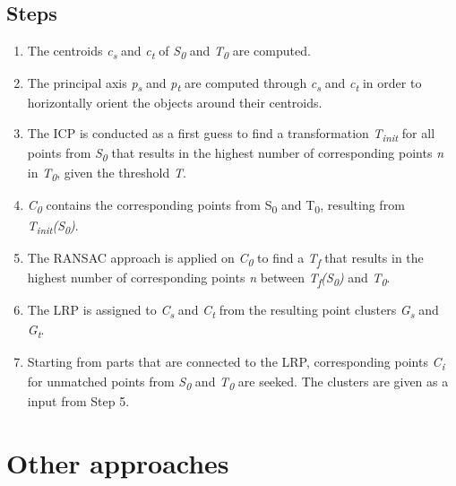 \documentclass[a4paper,english,11pt]{report}
\begin{document}
\subsection{Steps}

\begin{enumerate}
	\item The centroids \textit{c\textsubscript{s}} and \textit{c\textsubscript{t}} of \textit{S\textsubscript{0}} and \textit{T\textsubscript{0}} are computed.
	
	\item The principal axis \textit{p\textsubscript{s}} and \textit{p\textsubscript{t}}  are computed through \textit{c\textsubscript{s}} and \textit{c\textsubscript{t}} in order to horizontally orient the objects around their centroids.
	
	\item The ICP is conducted as a first guess to find a transformation \textit{T\textsubscript{init}} for all points from \textit{S\textsubscript{0}} that results in the highest number of corresponding points \textit{n} in \textit{T\textsubscript{0}}, given the threshold \textit{T}.
	
	\item \textit{C\textsubscript{0}} contains the corresponding points from S\textsubscript{0} and T\textsubscript{0}, resulting from \textit{T\textsubscript{init}(S\textsubscript{0})}.
	
	\item The RANSAC approach is applied on \textit{C\textsubscript{0}} to find a  \textit{T\textsubscript{f}} that results in the highest number of corresponding points \textit{n} between \textit{T\textsubscript{f}(S\textsubscript{0})} and \textit{T\textsubscript{0}}.
	
	\item The LRP is assigned to \textit{C\textsubscript{s}} and \textit{C\textsubscript{t}} from the resulting point clusters \textit{G\textsubscript{s}} and \textit{G\textsubscript{t}}.
	
	\item Starting from parts that are connected to the LRP, corresponding points \textit{C\textsubscript{i}} for unmatched points from \textit{S\textsubscript{0}} and \textit{T\textsubscript{0}} are seeked. The clusters are given as a input from Step 5. 
	
\end{enumerate}

\section{Other approaches}
\end{document}
